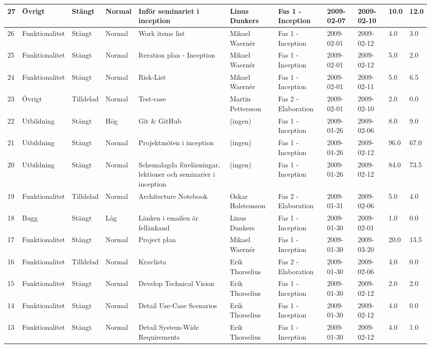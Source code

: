 \begin{center}
\begin{tabular}{| m{0.5cm} | l | l | l | m{5cm} | l | l | l | l | m{1.5cm} | m{1.5cm} |}
\hline 27 & Övrigt & Stängt & Normal & Inför seminariet i inception & Linus Dunkers & Fas 1 - Inception & 2009-02-07 & 2009-02-10 & 10.0 & 12.0 \\
\hline 26 & Funktionalitet & Stängt & Normal & Work items list & Mikael Waernér & Fas 1 - Inception & 2009-02-01 & 2009-02-12 & 4.0 & 3.0 \\
\hline 25 & Funktionalitet & Stängt & Normal & Iteration plan - Inception & Mikael Waernér & Fas 1 - Inception & 2009-02-01 & 2009-02-12 & 5.0 & 2.0 \\
\hline 24 & Funktionalitet & Stängt & Normal & Risk-List & Mikael Waernér & Fas 1 - Inception & 2009-02-01 & 2009-02-11 & 5.0 & 6.5 \\
\hline 23 & Övrigt & Tilldelad & Normal & Test-case & Martin Pettersson & Fas 2 - Elaboration & 2009-02-01 & 2009-02-10 & 2.0 & 0.0 \\
\hline 22 & Utbildning & Stängt & Hög & Git \& GitHub & (ingen) & Fas 1 - Inception & 2009-01-26 & 2009-02-06 & 8.0 & 9.0 \\
\hline 21 & Utbildning & Stängt & Normal & Projektmöten i inception & (ingen) & Fas 1 - Inception & 2009-01-26 & 2009-02-12 & 96.0 & 67.0 \\
\hline 20 & Utbildning & Stängt & Normal & Schemalagda föreläsningar, lektioner och seminarier i inception & (ingen) & Fas 1 - Inception & 2009-01-26 & 2009-02-12 & 84.0 & 73.5 \\
\hline 19 & Funktionalitet & Tilldelad & Normal & Architecture Notebook & Oskar Holstensson & Fas 2 - Elaboration & 2009-01-31 & 2009-02-06 & 5.0 & 4.0 \\
\hline 18 & Bugg & Stängt & Låg & Länken i emailen är fellänkand & Linus Dunkers & Fas 1 - Inception & 2009-01-30 & 2009-02-01 & 1.0 & 0.0 \\
\hline 17 & Funktionalitet & Stängt & Normal & Project plan & Mikael Waernér & Fas 1 - Inception & 2009-01-30 & 2009-03-20 & 20.0 & 13.5 \\
\hline 16 & Funktionalitet & Tilldelad & Normal & Kravlista & Erik Thorselius & Fas 2 - Elaboration & 2009-01-30 & 2009-02-06 & 4.0 & 0.0 \\
\hline 15 & Funktionalitet & Stängt & Normal & Develop Technical Vision & Erik Thorselius & Fas 1 - Inception & 2009-01-30 & 2009-02-12 & 2.0 & 2.0 \\
\hline 14 & Funktionalitet & Stängt & Normal & Detail Use-Case Scenarios & Erik Thorselius & Fas 1 - Inception & 2009-01-30 & 2009-02-12 & 4.0 & 0.0 \\
\hline 13 & Funktionalitet & Stängt & Normal & Detail System-Wide Requirements & Erik Thorselius & Fas 1 - Inception & 2009-01-30 & 2009-02-12 & 4.0 & 1.0 \\

\end{tabular}
\end{center}
